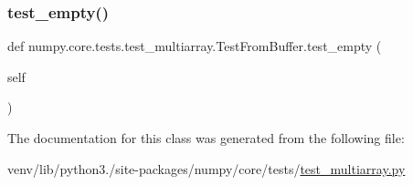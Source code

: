 \mbox{\label{classnumpy_1_1core_1_1tests_1_1test__multiarray_1_1TestFromBuffer_af2e353af13b4262d0f228e8c3cdff774}} 
\subsubsection{\texorpdfstring{test\+\_\+empty()}{test\_empty()}}
{\footnotesize\ttfamily def numpy.\+core.\+tests.\+test\+\_\+multiarray.\+Test\+From\+Buffer.\+test\+\_\+empty (\begin{DoxyParamCaption}\item[{}]{self }\end{DoxyParamCaption})}



The documentation for this class was generated from the following file\+:\begin{DoxyCompactItemize}
\item 
venv/lib/python3./site-\/packages/numpy/core/tests/\hyperlink{core_2tests_2test__multiarray_8py}{test\+\_\+multiarray.\+py}\end{DoxyCompactItemize}
